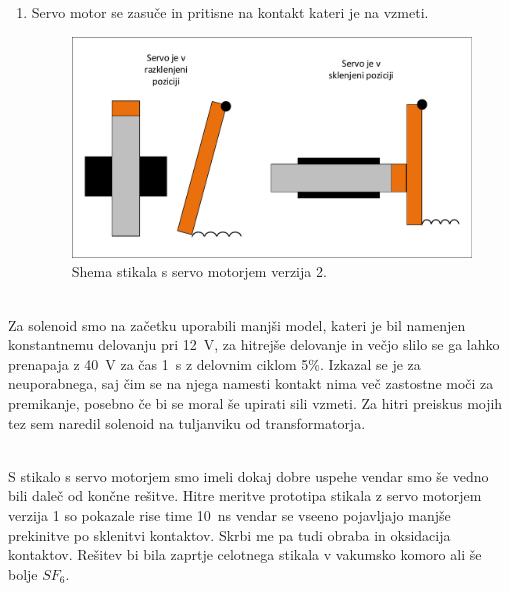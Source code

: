 \documentclass[a4paper,twoside,openright,12pt,slovene]{book}
\begin{document}
\begin{enumerate}
    \item  Servo motor se zasuče in pritisne na kontakt kateri je na vzmeti.
    \begin{figure}[H]
        \centering
        \includegraphics[width=1\columnwidth]{Sheme/StikaloServoVerzija2.pdf}
        \caption{\label{StikaloServoVerzija2} Shema stikala s servo motorjem verzija 2.}
    \end{figure}
\end{enumerate}


    ~\\Za solenoid smo na začetku uporabili manjši model, kateri je bil namenjen konstantnemu delovanju pri \SI{12}{\volt}, za hitrejše delovanje in večjo slilo se ga lahko prenapaja z  \SI{40}{\volt} za čas  \SI{1}{\second} z delovnim ciklom 5\%. Izkazal se je za neuporabnega, saj čim se na njega namesti kontakt nima več zastostne moči za premikanje, posebno če bi se moral še upirati sili vzmeti. Za hitri preiskus mojih tez sem naredil solenoid na tuljanviku od transformatorja.
    
    ~\\S stikalo s servo motorjem smo imeli dokaj dobre uspehe vendar smo še vedno bili daleč od končne rešitve. Hitre meritve prototipa stikala z servo motorjem verzija 1 so pokazale rise time  \SI{10}{\nano\second} vendar se vseeno pojavljajo manjše prekinitve po sklenitvi kontaktov. Skrbi me pa tudi obraba in oksidacija kontaktov. Rešitev bi bila zaprtje celotnega stikala v vakumsko komoro ali še bolje $SF_{6}$.
    
\end{document}
